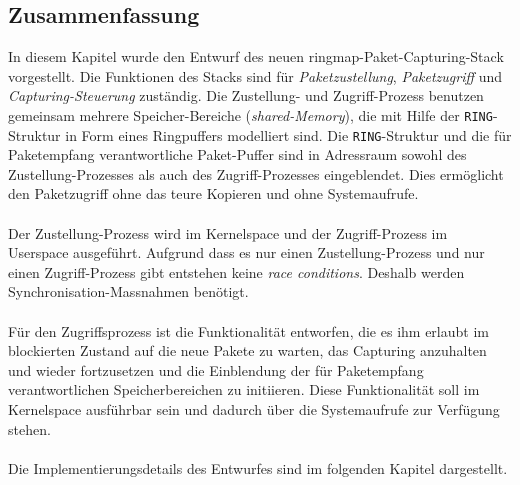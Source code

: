 \subsection{Zusammenfassung}
In diesem Kapitel wurde den Entwurf des neuen ringmap-Paket-Capturing-Stack
vorgestellt.  Die Funktionen des Stacks sind für \emph{Paketzustellung},
\emph{Paketzugriff} und \emph{Capturing-Steuerung} zuständig. Die Zustellung-
und Zugriff-Prozess benutzen gemeinsam mehrere Speicher-Bereiche
(\emph{shared-Memory}), die mit Hilfe der \verb+RING+-Struktur in Form eines
Ringpuffers modelliert sind.  Die \verb+RING+-Struktur und  die für
Paketempfang verantwortliche Paket-Puffer sind in Adressraum sowohl des
Zustellung-Prozesses als auch des Zugriff-Prozesses eingeblendet. Dies
ermöglicht den Paketzugriff ohne das teure Kopieren und ohne Systemaufrufe.\\\\
%
Der Zustellung-Prozess wird im Kernelspace und der Zugriff-Prozess im Userspace
ausgeführt. Aufgrund dass es nur einen Zustellung-Prozess und nur einen
Zugriff-Prozess gibt entstehen keine \emph{race conditions}. Deshalb werden
Synchronisation-Massnahmen benötigt.\\\\
%
Für den Zugriffsprozess ist die Funktionalität entworfen, die es ihm erlaubt im
blockierten Zustand auf die neue Pakete zu warten, das Capturing anzuhalten und
wieder fortzusetzen und die Einblendung der für Paketempfang verantwortlichen
Speicherbereichen zu initiieren. Diese Funktionalität soll im Kernelspace
ausführbar sein und dadurch über die Systemaufrufe zur Verfügung stehen.\\\\
Die Implementierungsdetails des Entwurfes sind im folgenden Kapitel
dargestellt.
